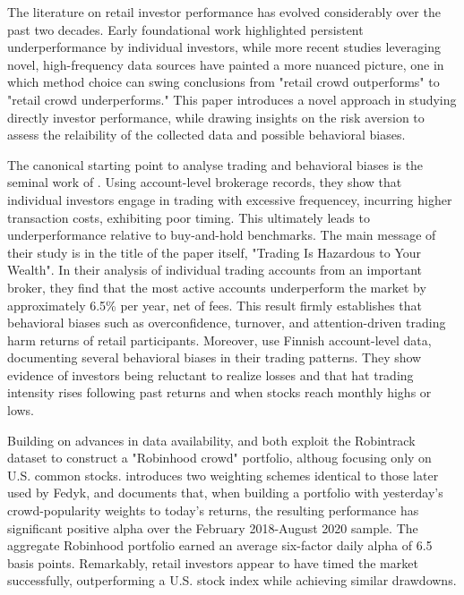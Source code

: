 The literature on retail investor performance has evolved considerably over the past two decades. 
Early foundational work highlighted persistent underperformance by individual investors, while more recent studies leveraging novel, high-frequency data sources have painted a more nuanced picture, one in which method choice can swing conclusions from "retail crowd outperforms" to "retail crowd underperforms."
This paper introduces a novel approach in studying directly investor performance, while drawing insights on the risk aversion to assess the relaibility of the collected data and possible behavioral biases.

The canonical starting point to analyse trading and behavioral biases is the seminal work of \cite{BarberOdean2000}. 
Using account-level brokerage records, they show that individual investors engage in trading with excessive frequencey, incurring higher transaction costs, 
exhibiting poor timing. This ultimately leads to underperformance relative to buy-and-hold benchmarks.
The main message of their study is in the title of the paper itself, "Trading Is Hazardous to Your Wealth".  
In their analysis of individual trading accounts from an important broker, they find that the most active accounts underperform the market by approximately 6.5\% per year, net of fees. 
This result firmly establishes that behavioral biases such as overconfidence, turnover, and attention-driven trading harm returns of retail participants.
Moreover, \cite{Grinblatt2001} use Finnish account-level data, documenting several behavioral biases in  their trading patterns.
They show evidence of investors being reluctant to realize losses and that hat trading intensity rises following past returns and when stocks reach monthly highs or lows.

Building on advances in data availability, \cite{Welch2022} and \cite{Fedyk2024} both exploit the Robintrack dataset to construct a "Robinhood crowd" portfolio, 
althoug focusing only on U.S. common stocks.
\cite{Welch2022} introduces two weighting schemes identical to those later used by Fedyk, and documents that, when building a portfolio with yesterday's crowd-popularity weights to today's returns, the resulting performance has significant positive alpha over the February 2018-August 2020 sample. 
The aggregate Robinhood portfolio earned an average six-factor daily alpha of 6.5 basis points.
Remarkably, retail investors appear to have timed the market successfully, outperforming a U.S. stock index while achieving similar drawdowns.

